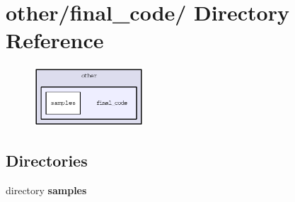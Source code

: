 \section{other/final\_\-code/ Directory Reference}
\label{dir_75f44ade89f855c60b4139f485f27c37}


\begin{figure}[H]
\begin{center}
\leavevmode
\includegraphics[width=116pt]{dir_75f44ade89f855c60b4139f485f27c37_dep}
\end{center}
\end{figure}
\subsection*{Directories}
\begin{CompactItemize}
\item 
directory \bf{samples}
\end{CompactItemize}
